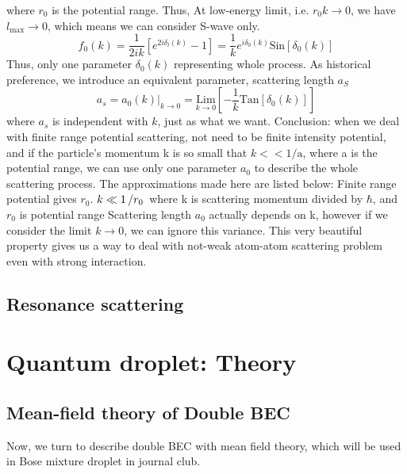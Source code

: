 where $r_0$ is the potential range. Thus, At low-energy limit, i.e. $r_0k\to 0$, we have $l_{\max }\to 0$, which means we can consider S-wave only.
\begin{equation}
f_0(k)=\frac{1}{2ik}\left[e^{2i\delta_l(k)}-1\right]=\frac{1}{k}e^{i \delta _0(k)}\text{Sin}\left[\delta _0(k)\right]
\end{equation}
Thus, only one parameter $\delta _0(k)$ representing whole process. As historical preference, we introduce an equivalent parameter, scattering length $a_S$
\begin{equation}
a_s=a_0(k)|_{k\to0}=\underset{k\to0}{\text{Lim}}\left[-\frac{1}{k}\text{Tan}\left[\delta _0(k)\right]\right]
\end{equation}
where $a_s$ is independent with $k$, just as what we want.
Conclusion: when we deal with finite range potential scattering, not need to be finite intensity potential, and if the particle's momentum k is so small that $k<<\text{1/a}$, where a is the potential range, we can use only one parameter $a_0$ to describe the whole scattering process. The approximations made here are listed below:
Finite range potential gives $r_0$.
$k\ll 1\left/r_0 \right.$ where k is scattering momentum divided by $\hbar$, and $r_0$ is potential range
Scattering length $a_0$ actually depends on k, however if we consider the limit $k\to 0$, we can ignore this variance.
This very beautiful property gives us a way to deal with not-weak atom-atom scattering problem even with strong interaction.

\subsection{Resonance scattering}


\section{Quantum droplet: Theory}
% 
\subsection{Mean-field theory of Double BEC}
Now, we turn to describe double BEC with mean field theory, which will be used in Bose mixture droplet in journal club.

